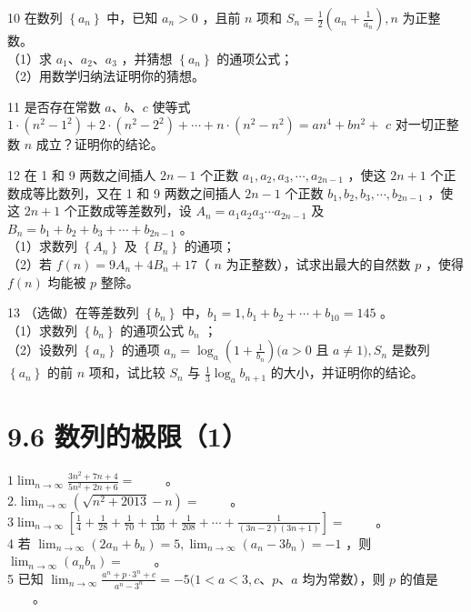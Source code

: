 \documentclass[10pt]{article}
\begin{document}
10 在数列 \(\left\{a_{n}\right\}\) 中，已知 \(a_{n}>0\) ，且前 \(n\) 项和 \(S_{n}=\frac{1}{2}\left(a_{n}+\frac{1}{a_{n}}\right), n\) 为正整数。\\
（1）求 \(a_{1} 、 a_{2} 、 a_{3}\) ，并猜想 \(\left\{a_{n}\right\}\) 的通项公式；\\
（2）用数学归纳法证明你的猜想。

11 是否存在常数 \(a 、 b 、 c\) 使等式 \(1 \cdot\left(n^{2}-1^{2}\right)+2 \cdot\left(n^{2}-2^{2}\right)+\cdots+n \cdot\left(n^{2}-n^{2}\right)=a n^{4}+b n^{2}+\) \(c\) 对一切正整数 \(n\) 成立？证明你的结论。

12 在 1 和 9 两数之间插人 \(2 n-1\) 个正数 \(a_{1}, a_{2}, a_{3}, \cdots, a_{2 n-1}\) ，使这 \(2 n+1\) 个正数成等比数列，又在 1 和 9 两数之间插人 \(2 n-1\) 个正数 \(b_{1}, b_{2}, b_{3}, \cdots, b_{2 n-1}\) ，使这 \(2 n+1\) 个正数成等差数列，设 \(A_{n}=a_{1} a_{2} a_{3} \cdots a_{2 n-1}\) 及 \(B_{n}=b_{1}+b_{2}+b_{3}+\cdots+b_{2 n-1}\) 。\\
（1）求数列 \(\left\{A_{n}\right\}\) 及 \(\left\{B_{n}\right\}\) 的通项；\\
（2）若 \(f(n)=9 A_{n}+4 B_{n}+17\)（ \(n\) 为正整数），试求出最大的自然数 \(p\) ，使得 \(f(n)\) 均能被 \(p\) 整除。

13 （选做）在等差数列 \(\left\{b_{n}\right\}\) 中，\(b_{1}=1, b_{1}+b_{2}+\cdots+b_{10}=145\) 。\\
（1）求数列 \(\left\{b_{n}\right\}\) 的通项公式 \(b_{n}\) ；\\
（2）设数列 \(\left\{a_{n}\right\}\) 的通项 \(a_{n}=\log _{a}\left(1+\frac{1}{b_{n}}\right)(a>0\) 且 \(a \neq 1), S_{n}\) 是数列 \(\left\{a_{n}\right\}\) 的前 \(n\) 项和，试比较 \(S_{n}\) 与 \(\frac{1}{3} \log _{a} b_{n+1}\) 的大小，并证明你的结论。

\section*{9.6 数列的极限（1）}
\(1 \lim _{n \rightarrow \infty} \frac{3 n^{2}+7 n+4}{5 n^{2}+2 n+6}=\) \(\qquad\)。\\
\(2 . \lim _{n \rightarrow \infty}\left(\sqrt{n^{2}+2013}-n\right)=\) \(\qquad\)。\\
\(3 \lim _{n \rightarrow \infty}\left[\frac{1}{4}+\frac{1}{28}+\frac{1}{70}+\frac{1}{130}+\frac{1}{208}+\cdots+\frac{1}{(3 n-2)(3 n+1)}\right]=\) \(\qquad\)。\\
4 若 \(\lim _{n \rightarrow \infty}\left(2 a_{n}+b_{n}\right)=5, \lim _{n \rightarrow \infty}\left(a_{n}-3 b_{n}\right)=-1\) ，则 \(\lim _{n \rightarrow \infty}\left(a_{n} b_{n}\right)=\) \(\qquad\)。\\
5 已知 \(\lim _{n \rightarrow \infty} \frac{a^{n}+p \cdot 3^{n}+c}{a^{n}-3^{n}}=-5(1<a<3, c 、 p 、 a\) 均为常数），则 \(p\) 的值是 \(\qquad\)。
\end{document}
